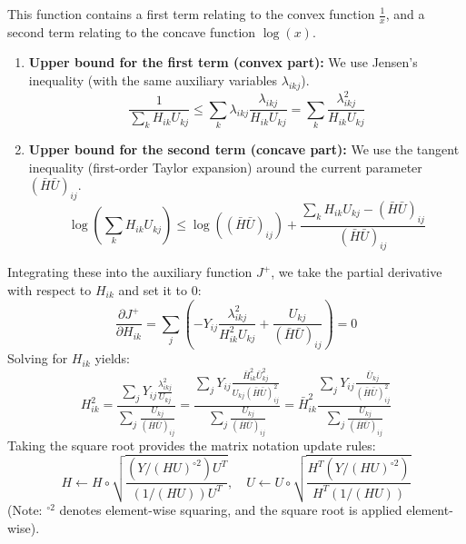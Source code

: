 \documentclass[12pt,a4paper]{article}
\begin{document}
This function contains a first term relating to the convex function $\frac{1}{x}$, and a second term relating to the concave function $\log(x)$.
\begin{enumerate}
    \item \textbf{Upper bound for the first term (convex part):} We use Jensen's inequality (with the same auxiliary variables $\lambda_{ikj}$).
    \begin{equation}
    \frac{1}{\sum_k H_{ik}U_{kj}} \leq \sum_k \lambda_{ikj} \frac{\lambda_{ikj}}{H_{ik}U_{kj}} = \sum_k \frac{\lambda_{ikj}^2}{H_{ik}U_{kj}}
    \end{equation}
    \item \textbf{Upper bound for the second term (concave part):} We use the tangent inequality (first-order Taylor expansion) around the current parameter $(\bar{H}\bar{U})_{ij}$.
    \begin{equation}
    \log \left(\sum_k H_{ik}U_{kj}\right) \leq \log \left((\bar{H}\bar{U})_{ij}\right) + \frac{\sum_k H_{ik}U_{kj} - (\bar{H}\bar{U})_{ij}}{(\bar{H}\bar{U})_{ij}}
    \end{equation}
\end{enumerate}

Integrating these into the auxiliary function $J^+$, we take the partial derivative with respect to $H_{ik}$ and set it to 0:
\begin{equation}
\frac{\partial J^+}{\partial H_{ik}} = \sum_j \left( - Y_{ij} \frac{\lambda_{ikj}^2}{H_{ik}^2 U_{kj}} + \frac{U_{kj}}{(\bar{H}\bar{U})_{ij}} \right) = 0
\end{equation}
Solving for $H_{ik}$ yields:
\begin{equation}
H_{ik}^2 = \frac{\sum_j Y_{ij} \frac{\lambda_{ikj}^2}{U_{kj}}}{\sum_j \frac{U_{kj}}{(\bar{H}\bar{U})_{ij}}} = \frac{\sum_j Y_{ij} \frac{\bar{H}_{ik}^2 \bar{U}_{kj}^2}{U_{kj} (\bar{H}\bar{U})_{ij}^2}}{\sum_j \frac{U_{kj}}{(\bar{H}\bar{U})_{ij}}} = \bar{H}_{ik}^2 \frac{\sum_j Y_{ij} \frac{\bar{U}_{kj}}{(\bar{H}\bar{U})_{ij}^2}}{\sum_j \frac{U_{kj}}{(\bar{H}\bar{U})_{ij}}}
\end{equation}
Taking the square root provides the matrix notation update rules:
\begin{equation}
H \leftarrow H \circ \sqrt{ \frac{(Y / (HU)^{\circ 2}) U^T}{(1 / (HU)) U^T} }, \quad U \leftarrow U \circ \sqrt{ \frac{H^T (Y / (HU)^{\circ 2})}{H^T (1 / (HU))} }
\end{equation}
(Note: $^{\circ 2}$ denotes element-wise squaring, and the square root is applied element-wise).
\end{document}
